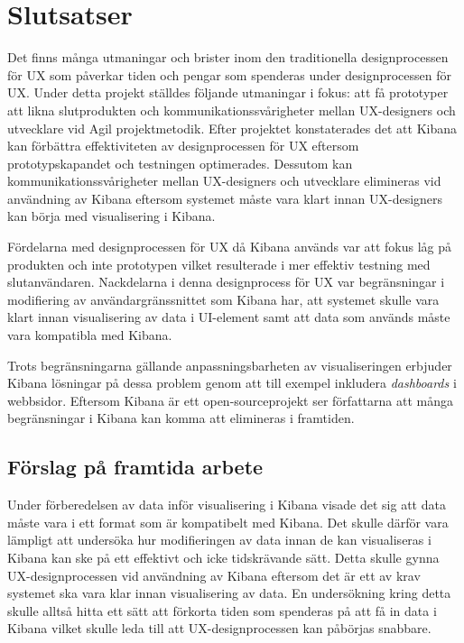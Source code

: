 \documentclass[12pt]{kththesis}
\begin{document}
\afterpage{\null\newpage}

\chapter{Slutsatser}
Det finns många utmaningar och brister inom den traditionella designprocessen för UX som påverkar tiden och pengar som spenderas under designprocessen för UX. Under detta projekt ställdes följande utmaningar i fokus: att få prototyper att likna slutprodukten och kommunikationssvårigheter mellan UX-designers och utvecklare vid Agil projektmetodik. Efter projektet konstaterades det att Kibana kan förbättra effektiviteten av designprocessen för UX eftersom prototypskapandet och testningen optimerades. Dessutom  kan kommunikationssvårigheter mellan UX-designers och utvecklare elimineras vid användning av Kibana eftersom systemet måste vara klart innan UX-designers kan börja med visualisering i Kibana. 

Fördelarna med designprocessen för UX då Kibana används var att fokus låg på produkten och inte prototypen vilket resulterade i mer effektiv testning med slutanvändaren. Nackdelarna i denna designprocess för UX var begränsningar i modifiering av användargränssnittet som Kibana har, att systemet skulle vara klart innan visualisering av data i UI-element samt att data som används måste vara kompatibla med Kibana.  

Trots begränsningarna gällande anpassningsbarheten av visualiseringen erbjuder Kibana lösningar på dessa problem genom att till exempel inkludera \textit{dashboards} i webbsidor.  Eftersom Kibana är ett open-sourceprojekt ser författarna att många begränsningar i Kibana kan komma att elimineras i framtiden. 

\section{Förslag på framtida arbete}
Under förberedelsen av data inför visualisering i Kibana visade det sig att data måste vara i ett format som är kompatibelt med Kibana. Det skulle därför vara lämpligt att undersöka hur modifieringen av data innan de kan visualiseras i Kibana kan ske på ett effektivt och icke tidskrävande sätt. Detta skulle gynna UX-designprocessen vid användning av Kibana eftersom det är ett av krav systemet ska vara klar innan visualisering av data. En undersökning kring detta skulle alltså hitta ett sätt att förkorta tiden som spenderas på att få in data i Kibana vilket skulle leda till att UX-designprocessen kan påbörjas snabbare.
\end{document}
